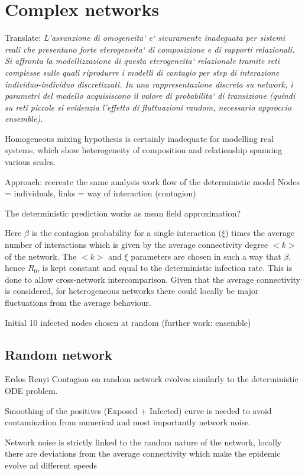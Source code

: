 \documentclass[DIV=12, BCOR=0pt]{scrartcl}  %
\begin{document}
  \section{Complex networks}
  Translate: \textit{L'assunzione di omogeneita` e` sicuramente inadeguata per sistemi reali che presentano forte eterogeneita` di composizione e di rapporti relazionali. Si affronta la modellizzazione di questa eterogeneita` relazionale tramite reti complesse sulle quali riprodurre i modelli di contagio per step di interazione individuo-individuo discretizzati. In una rappresentazione discreta su network, i parametri del modello acquisiscono il valore di probabilita` di transizione (quindi su reti piccole si evidenzia l'effetto di fluttuazioni random, necessario approccio ensemble).  }
  
  Homogeneous mixing hypothesis is certainly inadequate for modelling real systems, which show heterogeneity of composition and relationship spanning various scales. 
  
  
  Approach: recreate the same analysis work flow of the deterministic model
  Nodes = individuals, links = way of interaction (contagion)
  
  The deterministic prediction works as mean field approximation?
  
  Here $\beta$ is the contagion probability for a single interaction ($\xi$) times the average number of interactions which is given by the average connectivity degree $<k>$ of the network. The $<k>$ and $\xi$ parameters are chosen in such a way that $\beta$, hence $R_{0}$, is kept constant and equal to the deterministic infection rate. This is done to allow cross-network intercomparison. Given that the average connectivity is considered, for heterogeneous networks there could locally be major fluctuations from the average behaviour.
  
  
  Initial 10 infected nodes chosen at random (further work: ensemble)
  
  \subsection{Random network}
  Erdos Renyi
  Contagion on random network evolves similarly to the deterministic ODE problem. 
  
  Smoothing of the positives (Exposed + Infected) curve is needed to avoid contamination from numerical and most importantly network noise. 
  
  Network noise is strictly linked to the random nature of the network, locally there are deviations from the average connectivity which make the epidemic evolve ad different speeds
  
\end{document}
